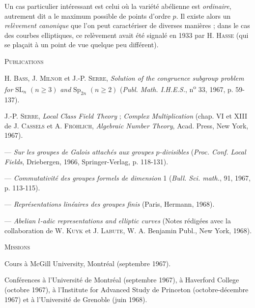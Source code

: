 Un cas particulier intéressant est celui où la variété abélienne est \textit{ordinaire}, autrement dit a le maximum possible de points d’ordre $p$. Il existe alors un \textit{relèvement canonique} que l’on peut caractériser de diverses manières ; dans le cas des courbes elliptiques, ce relèvement avait été signalé en 1933 par H. \textsc{Hasse} (qui se plaçait à un point de vue quelque peu différent).

\begin{center}\textsc{Publications}\end{center}

H. \textsc{Bass}, J. \textsc{Milnor} et J.-P. \textsc{Serre}, \textit{Solution of the congruence subgroup problem for} $\mathrm{SL}_n$ $(n\geqslant 3)$ \textit{and} $\mathrm{Sp}_{2n}$ $(n\geqslant 2)$ (\textit{Publ. Math. I.H.E.S.}, n\textsuperscript{o} 33, 1967, p. 59-137).

J.-P. \textsc{Serre}, \textit{Local Class Field Theory} ; \textit{Complex Multiplication} (chap. VI et XIII de J. \textsc{Cassels} et A. \textsc{Fröhlich}, \textit{Algebraic Number Theory}, Acad. Press, New York, 1967).

--- \textit{Sur les groupes de Galois attachés aux groupes $p$-divisibles} (\textit{Proc. Conf. Local Fields}, Driebergen, 1966, Springer-Verlag, p. 118-131).

--- \textit{Commutativité des groupes formels de dimension} 1 (\textit{Bull. Sci. math.}, 91, 1967, p. 113-115).

--- \textit{Représentations linéaires des groupes finis} (Paris, Hermann, 1968).

--- \textit{Abelian $l$-adic representations and elliptic curves} (Notes rédigées avec la collaboration de W. \textsc{Kuyk} et J. \textsc{Labute}, W. A. Benjamin Publ., New York, 1968).

\begin{center}\textsc{Missions}\end{center}

Cours à McGill University, Montréal (septembre 1967).

Conférences à l’Université de Montréal (septembre 1967), à Haverford College (octobre 1967), à l’Institute for Advanced Study de Princeton (octobre-décembre 1967) et à l’Université de Grenoble (juin 1968).
